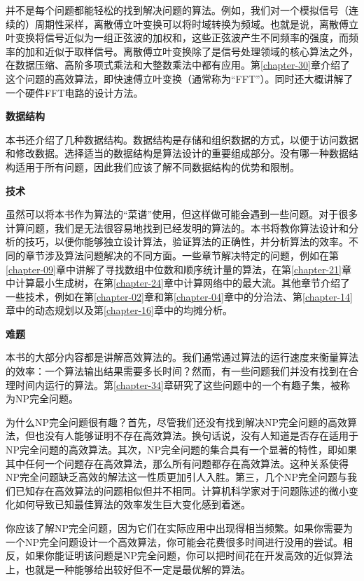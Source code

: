 \documentclass[lang=cn,newtx,10pt,scheme=chinese]{elegantbook}
\begin{document}
并不是每个问题都能轻松的找到解决问题的算法。例如，我们对一个模拟信号（连续的）周期性采样，离散傅立叶变换可以将时域转换为频域。也就是说，离散傅立叶变换将信号近似为一组正弦波的加权和，这些正弦波产生不同频率的强度，而频率的加和近似于取样信号。离散傅立叶变换除了是信号处理领域的核心算法之外，在数据压缩、高阶多项式乘法和大整数乘法中都有应用。第\ref{chapter-30}章介绍了这个问题的高效算法，即快速傅立叶变换（通常称为``FFT''）。同时还大概讲解了一个硬件FFT电路的设计方法。

\textbf{数据结构}

本书还介绍了几种数据结构。数据结构是存储和组织数据的方式，以便于访问数据和修改数据。选择适当的数据结构是算法设计的重要组成部分。没有哪一种数据结构适用于所有问题，因此我们应该了解不同数据结构的优势和限制。

\textbf{技术}

虽然可以将本书作为算法的``菜谱''使用，但这样做可能会遇到一些问题。对于很多计算问题，我们是无法很容易地找到已经发明的算法的。本书将教你算法设计和分析的技巧，以便你能够独立设计算法，验证算法的正确性，并分析算法的效率。不同的章节涉及算法问题解决的不同方面。一些章节解决特定的问题，例如在第\ref{chapter-09}章中讲解了寻找数组中位数和顺序统计量的算法，在第\ref{chapter-21}章中计算最小生成树，在第\ref{chapter-24}章中计算网络中的最大流。其他章节介绍了一些技术，例如在第\ref{chapter-02}章和第\ref{chapter-04}章中的分治法、第\ref{chapter-14}章中的动态规划以及第\ref{chapter-16}章中的均摊分析。

\textbf{难题}

本书的大部分内容都是讲解高效算法的。我们通常通过算法的运行速度来衡量算法的效率：一个算法输出结果需要多长时间？然而，有一些问题我们并没有找到在合理时间内运行的算法。第\ref{chapter-34}章研究了这些问题中的一个有趣子集，被称为NP完全问题。

为什么NP完全问题很有趣？首先，尽管我们还没有找到解决NP完全问题的高效算法，但也没有人能够证明不存在高效算法。换句话说，没有人知道是否存在适用于NP完全问题的高效算法。其次，NP完全问题的集合具有一个显著的特性，即如果其中任何一个问题存在高效算法，那么所有问题都存在高效算法。这种关系使得NP完全问题缺乏高效的解法这一性质更加引人入胜。第三，几个NP完全问题与我们已知存在高效算法的问题相似但并不相同。计算机科学家对于问题陈述的微小变化如何导致已知最佳算法的效率发生巨大变化感到着迷。

你应该了解NP完全问题，因为它们在实际应用中出现得相当频繁。如果你需要为一个NP完全问题设计一个高效算法，你可能会花费很多时间进行没用的尝试。相反，如果你能证明该问题是NP完全问题，你可以把时间花在开发高效的近似算法上，也就是一种能够给出较好但不一定是最优解的算法。
\end{document}
